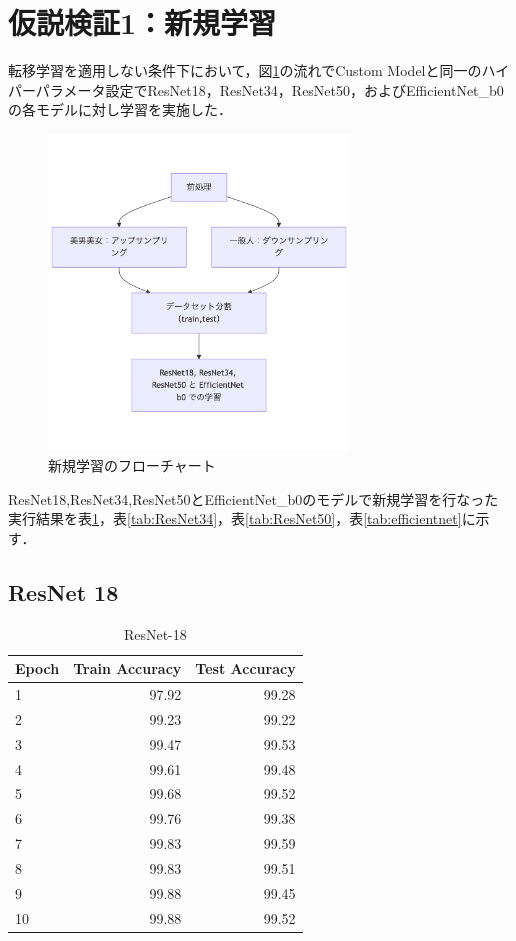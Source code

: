 \documentclass[a4paper,11pt,titlepage]{jsarticle}
\begin{document}
\section{仮説検証1：新規学習}
転移学習を適用しない条件下において，図\ref{fig:shinkigakushu}の流れでCustom Modelと同一のハイパーパラメータ設定でResNet18，ResNet34，ResNet50，およびEfficientNet\_b0の各モデルに対し学習を実施した．
\begin{figure}[H]
    \centering
    \includegraphics[width=80mm]{shinkigakushu.png}
    \caption{新規学習のフローチャート}
    \label{fig:shinkigakushu}
\end{figure}


ResNet18,ResNet34,ResNet50とEfficientNet\_b0のモデルで新規学習を行なった実行結果を表\ref{tab:ResNet18}，表\ref{tab:ResNet34}，表\ref{tab:ResNet50}，表\ref{tab:efficientnet}に示す．

\subsection{ResNet 18}
\begin{table}[H]
\centering
\caption{ResNet-18}
\label{tab:ResNet18}
\begin{tabular}{lrr}
\hline
 Epoch &  Train Accuracy &  Test Accuracy \\
\hline
     1 &           97.92 &                99.28 \\
     2 &           99.23 &                99.22 \\
     3 &           99.47 &                99.53 \\
     4 &           99.61 &                99.48 \\
     5 &           99.68 &                99.52 \\
     6 &           99.76 &                99.38 \\
     7 &           99.83 &                99.59 \\
     8 &           99.83 &                99.51 \\
     9 &           99.88 &                99.45 \\
    10 &           99.88 &                99.52 \\
\hline
\end{tabular}
\end{table}
\end{document}
